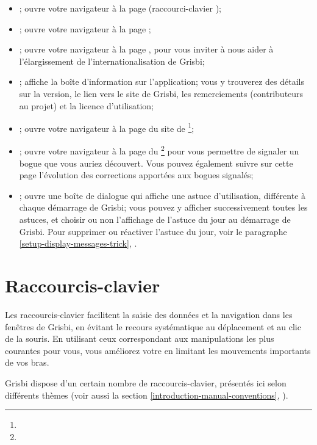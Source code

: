 \begin{itemize}
	\item {}; ouvre votre navigateur à la page  (raccourci-clavier );
	\item {}; ouvre votre navigateur à la page ;
	\item {}; ouvre votre navigateur à la page , pour vous inviter à nous aider à l'élargissement de 	l'internationalisation de Grisbi;
	\item {}; affiche la boîte d'information sur l'application; vous y trouverez des détails sur la version, le lien vers le site de Grisbi, les remerciements (contributeurs au projet) et la licence d'utilisation;
	\item {}; ouvre votre navigateur à la page du site de \footnote{\urlGrisbi{}};
	\item {}; ouvre votre navigateur à la page du \footnote{\urlBugTracker{}} pour vous permettre de signaler un bogue que vous auriez découvert. Vous pouvez également suivre sur cette page l'évolution des corrections apportées aux bogues signalés;
	\item {}; ouvre une boîte de dialogue qui affiche une astuce d'utilisation, différente à chaque démarrage de Grisbi; vous pouvez y 	afficher successivement toutes les astuces, et choisir ou non l'affichage de 	l'astuce du jour au démarrage de Grisbi. Pour supprimer ou réactiver l'astuce du 	jour, voir le paragraphe \vref{setup-display-messages-trick}, .
\end{itemize}


\section{Raccourcis-clavier\label{home-shortcuts}}


Les raccourcis-clavier facilitent la saisie des données et la navigation dans les fenêtres de Grisbi, en évitant le recours systématique au déplacement et au clic de la souris. En utilisant ceux correspondant aux manipulations les plus courantes pour vous, vous améliorez votre  en limitant les mouvements importants de vos bras.
 
Grisbi dispose d'un certain nombre de raccourcis-clavier, présentés ici selon différents thèmes (voir aussi la section \vref{introduction-manual-conventions}, ).


